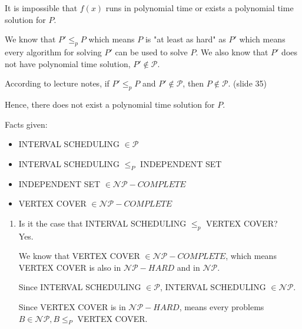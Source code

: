 \documentclass{cpsc413Solutions}
\begin{document}


\begin{problemlist}
\pbitem 
\begin{problem}
\begin{answer}

It is impossible that $f(x)$ runs in polynomial time or exists a polynomial time solution for $P$.

We know that $P' \leq_p P$ which means $P$ is 
"at least as hard" as $P'$ which means every algorithm for solving $P'$ can be used to solve $P$. We also know that $P'$ does not have polynomial time solution, $P' \notin \mathcal{P}$.

According to lecture notes, if $P' \leq_p P$ and $P' \notin \mathcal{P}$, then $P \notin \mathcal{P}$. (slide 35)

Hence, there does not exist a polynomial time solution for $P$.

\end{answer}
\end{problem}


\begin{problem}
\begin{answer}

Facts given:
    \begin{itemize}
        \item INTERVAL SCHEDULING $\in \mathcal{P}$
        \item INTERVAL SCHEDULING $\leq_P$ INDEPENDENT SET
        \item INDEPENDENT SET $\in \mathcal{NP}-COMPLETE$
        \item VERTEX COVER $\in \mathcal{NP}-COMPLETE$
    \end{itemize}
    
\begin{enumerate}
    \item Is it the case that INTERVAL SCHEDULING $\leq_p$ VERTEX COVER?\\
    
    Yes.
    
    We know that VERTEX COVER $\in \mathcal{NP}-COMPLETE$, which means VERTEX COVER is also in $\mathcal{NP}-HARD$ and in $\mathcal{NP}$.
    
    Since INTERVAL SCHEDULING $\in \mathcal{P}$, INTERVAL SCHEDULING $\in \mathcal{NP}$.
    
    Since VERTEX COVER is in $\mathcal{NP}-HARD$, means every problems $B \in \mathcal{NP}, B \leq_P$ VERTEX COVER.
    

\end{enumerate}
\end{answer}
\end{problem}
\end{problemlist}
\end{document}
